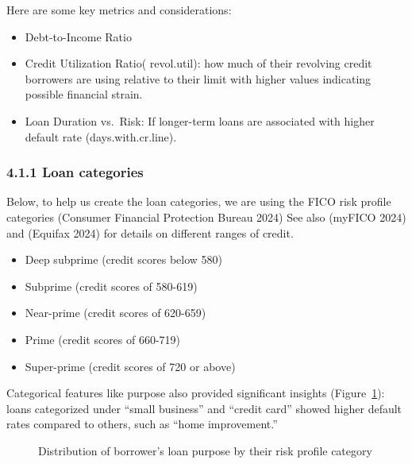 \documentclass[
  letterpaper,
  DIV=11,
  numbers=noendperiod]{scrartcl}
\begin{document}
Here are some key metrics and considerations:

\begin{itemize}
\item
  Debt-to-Income Ratio
\item
  Credit Utilization Ratio( revol.util): how much of their revolving
  credit borrowers are using relative to their limit with higher values
  indicating possible financial strain.
\item
  Loan Duration vs.~Risk: If longer-term loans are associated with
  higher default rate (days.with.cr.line).
\end{itemize}

\subsubsection{4.1.1 Loan categories}\label{loan-categories}

Below, to help us create the loan categories, we are using the FICO risk
profile categories (Consumer Financial Protection Bureau 2024) See also
(myFICO 2024) and (Equifax 2024) for details on different ranges of
credit.

\begin{itemize}
\item
  Deep subprime (credit scores below 580)
\item
  Subprime (credit scores of 580-619)
\item
  Near-prime (credit scores of 620-659)
\item
  Prime (credit scores of 660-719)
\item
  Super-prime (credit scores of 720 or above)
\end{itemize}

Categorical features like purpose also provided significant insights
(Figure~\ref{fig-purpose_risk}): loans categorized under ``small
business'' and ``credit card'' showed higher default rates compared to
others, such as ``home improvement.''

\begin{figure}


\caption{\label{fig-purpose_risk}Distribution of borrower's loan purpose
by their risk profile category}

\end{figure}%
\end{document}
